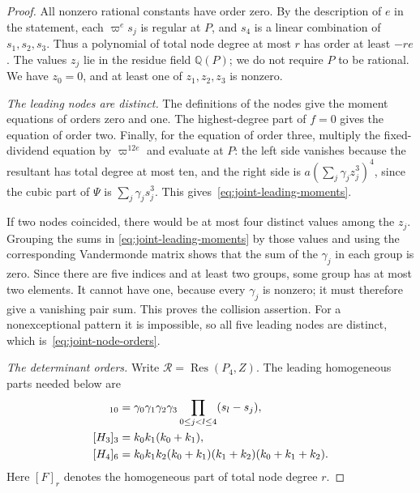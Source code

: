 \documentclass[11pt]{article}
\theoremstyle{definition}
\theoremstyle{remark}
\begin{document}
\begin{proof}
All nonzero rational constants have order zero. By the description of $e$ in
the statement, each $\varpi^es_j$ is regular at $P$, and $s_4$ is a linear
combination of $s_1,s_2,s_3$. Thus a polynomial of total node degree at most $r$
has order at least $-re$. The values $z_j$ lie in the residue field $\mathbb Q(P)$; we do not
require $P$ to be rational.
We have $z_0=0$, and at least one of $z_1,z_2,z_3$ is nonzero.

\emph{The leading nodes are distinct.}
The definitions of the nodes give the moment equations of orders zero
and one. The highest-degree part of $f=0$ gives the equation of order two.
Finally, for the equation of order three, multiply the fixed-dividend
equation by $\varpi^{12e}$ and evaluate at $P$: the left side vanishes because
the resultant has total degree at most ten, and the right side is
$a(\sum_j\gamma_jz_j^3)^4$, since the cubic part of $\Psi$ is
$\sum_j\gamma_js_j^3$. This gives~\eqref{eq:joint-leading-moments}.

If two nodes coincided, there would be at most four distinct values among
the $z_j$. Grouping the sums in \eqref{eq:joint-leading-moments} by those
values and using the corresponding Vandermonde matrix shows that the
sum of the $\gamma_j$ in each group is zero.
Since there are five indices and at least two groups, some group has at
most two elements. It cannot have one, because every $\gamma_j$ is nonzero;
it must therefore give a vanishing pair sum. This proves the collision
assertion. For a nonexceptional pattern it is impossible, so all five
leading nodes are distinct, which is~\eqref{eq:joint-node-orders}.

\emph{The determinant orders.}
Write $\mathcal R=\operatorname{Res}(P_4,Z)$.
The leading homogeneous parts needed below are
\begin{align}
 [\mathcal R]_{10}
   &=\gamma_0\gamma_1\gamma_2\gamma_3
        \prod_{0\le j<l\le4}(s_l-s_j), \label{eq:joint-resultant-leading}\\
 [H_3]_3&=k_0k_1(k_0+k_1),\notag\\
 [H_4]_6&=k_0k_1k_2(k_0+k_1)(k_1+k_2)(k_0+k_1+k_2).
 \label{eq:joint-hankel-leading}
\end{align}
Here $[F]_r$ denotes the homogeneous part of total node degree $r$.


\end{proof}
\end{document}
